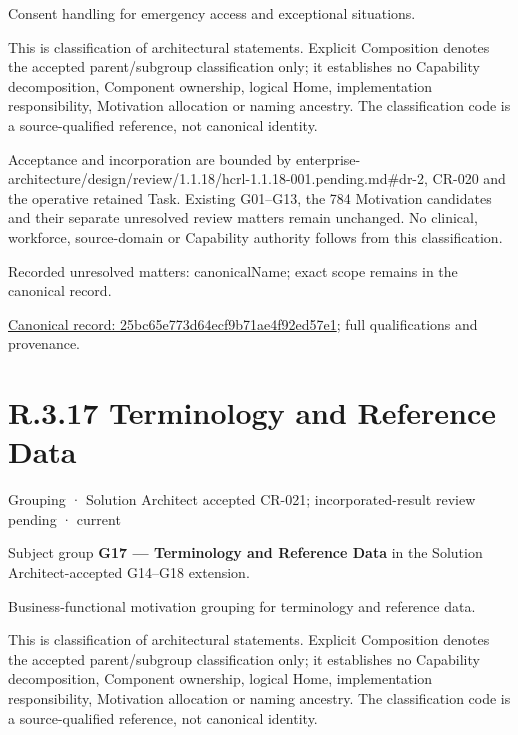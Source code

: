 Consent handling for emergency access and exceptional situations.



This is classification of architectural statements. Explicit Composition denotes the accepted parent/subgroup classification only; it establishes no Capability decomposition, Component ownership, logical Home, implementation responsibility, Motivation allocation or naming ancestry. The classification code is a source-qualified reference, not canonical identity.



Acceptance and incorporation are bounded by enterprise-architecture/design/review/1.1.18/hcrl-1.1.18-001.pending.md\#dr-2, CR-020 and the operative retained Task. Existing G01–G13, the 784 Motivation candidates and their separate unresolved review matters remain unchanged. No clinical, workforce, source-domain or Capability authority follows from this classification.


{\small Recorded unresolved matters: canonicalName; exact scope remains in the canonical record.}\par
{\footnotesize \href{../../../../continuum/grouping/25bc65e773d64ecf9b71ae4f92ed57e1.md}{Canonical record: 25bc65e773d64ecf9b71ae4f92ed57e1}; full qualifications and provenance.}\par
\section*{R.3.17 Terminology and Reference Data}
\label{navigation:R.3.17}

\label{element:8b27323cbaba400698842f77e0d28c0d}
{\small Grouping · Solution Architect accepted CR-021; incorporated-result review pending · current}\par

Subject group \textbf{G17 — Terminology and Reference Data} in the Solution Architect-accepted G14–G18 extension.



Business-functional motivation grouping for terminology and reference data.



This is classification of architectural statements. Explicit Composition denotes the accepted parent/subgroup classification only; it establishes no Capability decomposition, Component ownership, logical Home, implementation responsibility, Motivation allocation or naming ancestry. The classification code is a source-qualified reference, not canonical identity.



